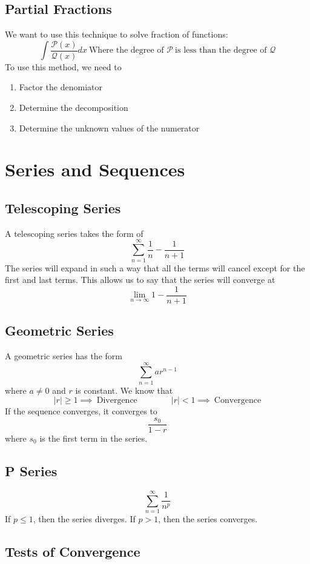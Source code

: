 \documentclass{article}
\begin{document}
\subsection{Partial Fractions}
We want to use this technique to solve fraction of functions:
\[
\int \frac{\mathcal{P}(x)}{\mathcal{Q}(x)}dx\ \text{Where the degree of }\mathcal{P}\ \text{is less than the degree of }\mathcal{Q}
\]
To use this method, we need to
\begin{enumerate}
\item Factor the denomiator
\item Determine the decomposition
\item Determine the unknown values of the numerator
\end{enumerate}


\section{Series and Sequences}
\subsection{Telescoping Series}
A telescoping series takes the form of
\[
\sum_{n=1}^{\infty} \frac{1}{n} - \frac{1}{n+1}
\]
The series will expand in such a way that all the terms will cancel except for the first and last terms.
This allows us to say that the series will converge at
\[
\lim_{n\to\infty} 1 - \frac{1}{n+1}
\]

\subsection{Geometric Series}
A geometric series has the form
\[
\sum_{n=1}^{\infty}ar^{n-1}
\]
where $a\neq 0$ and $r$ is constant.
We know that
\[
|r| \geq 1 \implies\ \text{Divergence}\qquad\qquad |r| < 1\implies\ \text{Convergence}
\]
If the sequence converges, it converges to
\[
\frac{s_{0}}{1 - r}
\]
where $s_{0}$ is the first term in the series.

\subsection{P Series}
\[
\sum_{n=1}^{\infty}\frac{1}{n^{p}}
\]
If $p \leq 1$, then the series diverges. If $p > 1$, then the series converges.

\subsection{Tests of Convergence}
\end{document}
